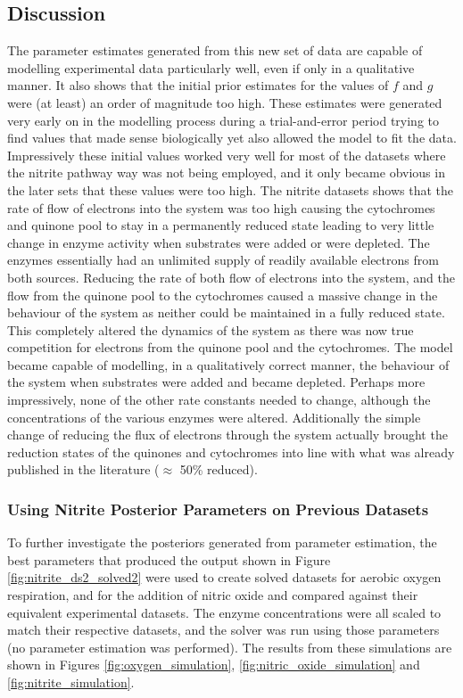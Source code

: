 \subsection{Discussion}
The parameter estimates generated from this new set of data are capable of modelling experimental data particularly well, even if only in a qualitative manner. It also shows that the initial prior estimates for the values of $f$ and $g$ were (at least) an order of magnitude too high. These estimates were generated very early on in the modelling process during a trial-and-error period trying to find values that made sense biologically yet also allowed the model to fit the data. Impressively these initial values worked very well for most of the datasets where the nitrite pathway way was not being employed, and it only became obvious in the later sets that these values were too high. The nitrite datasets shows that the rate of flow of electrons into the system was too high causing the cytochromes and quinone pool to stay in a permanently reduced state leading to very little change in enzyme activity when substrates were added or were depleted. The enzymes essentially had an unlimited supply of readily available
electrons from both sources. Reducing the rate of both flow of electrons into the system, and the flow from the quinone pool to the cytochromes caused a massive change in the behaviour of the system as neither could be maintained in a fully reduced state. This completely altered the dynamics of the system as there was now true competition for electrons from the quinone pool and the cytochromes. The model became capable of modelling, in a qualitatively correct manner, the behaviour of the system when substrates were added and became depleted. Perhaps more impressively, none of the other rate constants needed to change, although the concentrations of the various enzymes were altered. Additionally the simple change of reducing the flux of electrons through the system actually brought the reduction states of the quinones and cytochromes into line with what was already published in the literature ($\approx$ 50\% reduced)\cite{Otten1999}.

\subsubsection[Using Nitrite Posterior Parameters]{Using Nitrite Posterior Parameters on Previous Datasets}
To further investigate the posteriors generated from parameter estimation, the best parameters that produced the output shown in Figure \ref{fig:nitrite_ds2_solved2} were used to create solved datasets for aerobic oxygen respiration, and for the addition of nitric oxide and compared against their equivalent experimental datasets. The enzyme concentrations were all scaled to match their respective datasets, and the solver was run using those parameters (no parameter estimation was performed). The results from these simulations are shown in Figures \ref{fig:oxygen_simulation}, \ref{fig:nitric_oxide_simulation} and \ref{fig:nitrite_simulation}.

